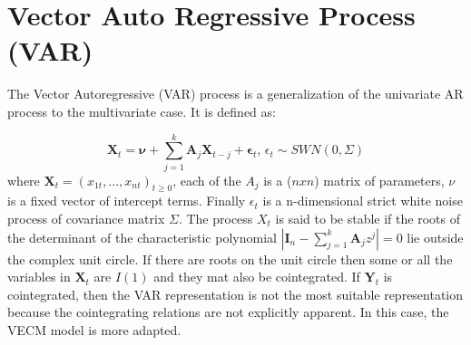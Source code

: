 \documentclass[11pt,a4,twosided,singlespacing,titlepagenumber=on]{scrreprt}
\newcommand{\matr}[1]{\mathbf{#1}} %
\numberwithin{equation}{chapter} %
\theoremstyle{remark}
\begin{document}
\section{Vector Auto Regressive Process (VAR)}
The Vector Autoregressive (VAR) process is a generalization of the univariate AR process to the multivariate case. It is defined as:

$$\matr{X}_t = \matr{\nu} + \sum_{j=1}^k \matr{A}_j \matr{X}_{t-j} + \matr{\epsilon}_t \text{, } \epsilon_t \sim SWN(0, \Sigma)$$
where $\matr{X}_t = (x_{1t},...,x_{nt})_{t \geq 0}$, each of the $A_j$ is a ($nxn$) matrix of parameters, $\nu$ is a fixed vector of intercept terms. Finally $\epsilon_t$ is a n-dimensional strict white noise process of covariance matrix $\Sigma$. The process $X_t$ is said to be stable if the roots of the determinant of the characteristic polynomial $|\matr{I}_n - \sum_{j=1}^k \matr{A}_j z^j| = 0$ lie outside the complex unit circle. If there are roots on the unit circle then some or all the variables in $\matr{X}_t$ are $I(1)$ and they mat also be cointegrated. If $\matr{Y}_t$ is cointegrated, then the VAR representation is not the most suitable representation because the cointegrating relations are not explicitly apparent. In this case, the VECM model is more adapted.
\end{document}

